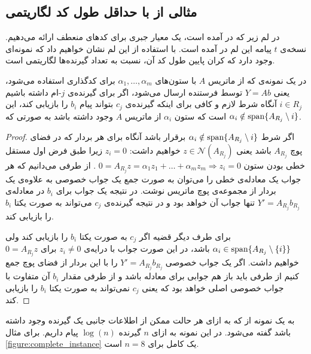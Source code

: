 \subsection{
	مثالی از
\lpicod
با حداقل طول کد لگاریتمی
}
در لم زیر که در
\cite{song2016deterministic}
آمده است، یک معیار جبری برای کدهای منعطف ارائه می‌دهیم. نسخه‌ی
$t$
پیامه این لم در
\cite{linqiphd}
آمده است. با استفاده از این لم نشان خواهیم داد که نمونه‌ای وجود دارد که کران پایین طول کد آن، نسبت به تعداد گیرنده‌ها لگاریتمی است. 
\begin{lemma}
	\label{lemma:algebraicconstraint}
	در یک نمونه‌ی
	\lpicod
	که از ماتریس
	$A$
	با ستون‌های 
	$\alpha_1, \ldots, \alpha_m$
	برای کدگذاری استفاده می‌شود، یعنی
	$Y = A b$
	توسط فرستنده ارسال می‌شود، اگر برای گیرنده‌ی
	$j$-ام
	داشته باشیم
	$i \in R_j$
	آنگاه شرط لازم و کافی برای اینکه گیرنده‌‌ی 
	$c_j$
	بتواند پیام 
	$b_i$
	را بازیابی کند، این است که ستون
	$\alpha_i$
	از ماتریس
	$A$
	وجود داشته باشد به صورتی که
	$\alpha_i \notin \operatorname{span} \{A_{R_j} \setminus i\}$.
\end{lemma}
\begin{proof}
	اگر شرط
	$\alpha_i \notin \operatorname{span}\{A_{R_j} \setminus i\}$
	برقرار باشد آنگاه برای هر بردار که در فضای پوچ
	$A_{R_j}$
	باشد یعنی
	$z \in \mathcal{N}(A_{R_j})$
	خواهیم داشت:
	$z_i = 0$
	زیرا طبق فرض اول مستقل خطی بودن ستون
	$0 = A_{R_j} z  = \alpha_1 z_1 + \ldots + \alpha_m z_m \Rightarrow z_i = 0$
	.  از طرفی می‌دانیم که هر جواب یک معادله‌ی خطی را می‌توان به صورت جمع یک جواب خصوصی به علاوه‌ی یک بردار از مجموعه‌ی پوچ ماتریس نوشت. در نتیجه یک جواب برای 
	$b_i$
	در معادله‌ی
	$Y' = A_{R_j} b_{R_j}$
	تنها جواب آن خواهد بود و در نتیجه گیرنده‌ی
	$c_j$
	می‌تواند به صورت یکتا
	$b_i$
	را بازیابی کند.
	
	برای طرف دیگر قضیه اگر 
	$c_j$
	به صورت یکتا
	$b_i$
	را بازیابی کند ولی
	$\alpha_i \in \operatorname{span}\{A_{R_j} \setminus \{i\}\}$
	باشد، در این صورت جواب با درایه‌ی
	$z_i \neq 0$
	برای
	$0 = A_{R_j} z$
	خواهیم داشت. اگر یک جواب خصوصی
	$Y' = A_{R_j} b_{R_j}$
	را با این بردار از فضای پوچ جمع کنیم از طرفی باید باز هم جوابی برای معادله باشد و از طرفی مقدار
	$b_i$
	آن متفاوت با جواب خصوصی اصلی خواهد بود که یعنی 
	$c_j$
	نمی‌تواند به صورت یکتا
	$b_i$
	را بازیابی کند.	
\end{proof}
\begin{definition}
	به یک نمونه از
	\picod
	که به ازای هر حالت ممکن از اطلاعات جانبی یک گیرنده وجود داشته باشد گفته می‌شود. در این نمونه به ازای
	$n$
	گیرنده
	$\log(n)$
	پیام داریم.	 برای مثال
	\autoref{figure:complete_instance}
	یک
	\picod
	کامل برای
	$n= 8$
	است.
\end{definition}
